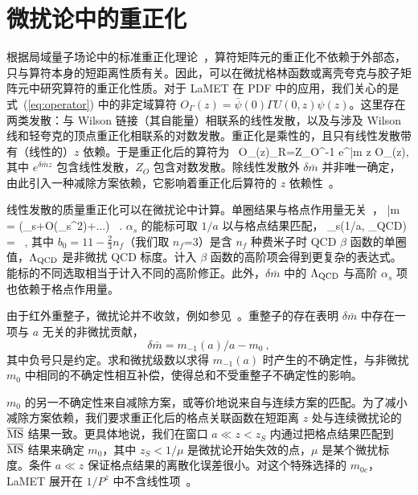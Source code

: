 \section{微扰论中的重正化}\label{sec:theory}

根据局域量子场论中的标准重正化理论~\cite{Collins:1984xc}，算符矩阵元的重正化不依赖于外部态，只与算符本身的短距离性质有关。因此，可以在微扰格林函数或离壳夸克与胶子矩阵元中研究算符的重正化性质。对于 LaMET 在 PDF 中的应用，我们关心的是式~(\ref{eq:operator}) 中的非定域算符 $O_{\Gamma}(z)=\bar{\psi}(0) \Gamma U(0,z) \psi (z)$。这里存在两类发散：与 Wilson 链接（其自能量）相联系的线性发散，以及与涉及 Wilson 线和轻夸克的顶点重正化相联系的对数发散。重正化是乘性的，且只有线性发散带有（线性的）$z$ 依赖。于是重正化后的算符为~\cite{Ji:2017oey,Ishikawa:2017faj,Green:2017xeu, Ji:2020brr}
\bea\label{eq:Reoperator}
O_{\Gamma}(z)_{R}=Z_{O}^{-1} e^{\delta \bar{m} z} O_\Gamma(z),
\eea
其中 $e^{\delta \bar{m} z}$ 包含线性发散，$Z_{O}$ 包含对数发散。除线性发散外 $\delta \bar{m}$ 并非唯一确定，由此引入一种减除方案依赖，它影响着重正化后算符的 $z$ 依赖性~\cite{Ji:2020brr}。

线性发散的质量重正化可以在微扰论中计算。单圈结果与格点作用量无关~\cite{Chen:2016fxx}，
\bea\label{eq:delta_m}
\delta \bar{m} = (\alpha_s+{\cal O}(\alpha_s^2)+...) \ .
\eea
$\alpha_{s}$ 的能标可取 $1/a$ 以与格点结果匹配，
\bea\label{eq:alpha_s}
\alpha_{s}(1/a, \Lambda_{\rm QCD}) =  \ ,
\eea
其中 $b_{0}=11-\frac{2}{3}n_f$（我们取 $n_f$=3）是含 $n_f$ 种费米子时 QCD $\beta$ 函数的单圈值，$\Lambda_{\rm QCD}$ 是非微扰 QCD 标度。计入 $\beta$ 函数的高阶项会得到更复杂的表达式。能标的不同选取相当于计入不同的高阶修正。此外，$\delta \bar{m}$ 中的 $\Lambda_{\rm QCD}$ 与高阶 $\alpha_s$ 项也依赖于格点作用量。

由于红外重整子，微扰论并不收敛，例如参见~\cite{Ji:1995tm,Beneke:1998ui,Bauer:2011ws,Bali:2013pla}。重整子的存在表明 $\delta \bar m$ 中存在一项与 $a$ 无关的非微扰贡献，
\begin{equation}\label{eq:m0}
      \delta\bar m = m_{-1}(a)/a - m_0 \ ,
\end{equation}
其中负号只是约定。求和微扰级数以求得 $m_{-1}(a)$ 时产生的不确定性，与非微扰 $m_0$ 中相同的不确定性相互补偿，使得总和不受重整子不确定性的影响。

$m_0$ 的另一不确定性来自减除方案，或等价地说来自与连续方案的匹配。为了减小减除方案依赖，我们要求重正化后的格点关联函数在短距离 $z$ 处与连续微扰论的 $\overline{\rm MS}$ 结果一致。更具体地说，我们在窗口 $a \ll z < z_S$ 内通过把格点结果匹配到 $\overline{\rm MS}$ 结果来确定 $m_0$，其中 $z_S < 1/\mu$ 是微扰论开始失效的点，$\mu$ 是某个微扰标度。条件 $a \ll z$ 保证格点结果的离散化误差很小。对这个特殊选择的 $m_{0c}$，LaMET 展开在 $1/P^z$ 中不含线性项~\cite{Ji:2020brr}。

